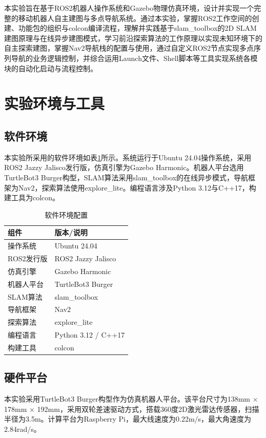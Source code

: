 \documentclass[a4paper,12pt]{article}
\begin{document}
本实验旨在基于ROS2机器人操作系统和Gazebo物理仿真环境，设计并实现一个完整的移动机器人自主建图与多点导航系统。通过本实验，掌握ROS2工作空间的创建、功能包的组织与colcon编译流程，理解并实践基于slam\_toolbox的2D SLAM建图原理与在线异步建图模式，学习前沿探索算法的工作原理以实现未知环境下的自主探索建图，掌握Nav2导航栈的配置与使用，通过自定义ROS2节点实现多点序列导航的业务逻辑控制，并综合运用Launch文件、Shell脚本等工具实现系统各模块的自动化启动与流程控制。

\section{实验环境与工具}

\subsection{软件环境}

本实验所采用的软件环境如表\ref{tab:software}所示。系统运行于Ubuntu 24.04操作系统，采用ROS2 Jazzy Jalisco发行版，仿真引擎为Gazebo Harmonic。机器人平台选用TurtleBot3 Burger构型，SLAM算法采用slam\_toolbox的在线异步模式，导航框架为Nav2，探索算法使用explore\_lite。编程语言涉及Python 3.12与C++17，构建工具为colcon。

\begin{table}[H]
\centering
\caption{软件环境配置}
\label{tab:software}
\begin{tabular}{ll}
\toprule
组件 & 版本/说明 \\
\midrule
操作系统 & Ubuntu 24.04  \\
ROS2发行版 & ROS2 Jazzy Jalisco \\
仿真引擎 & Gazebo Harmonic \\
机器人平台 & TurtleBot3 Burger \\
SLAM算法 & slam\_toolbox  \\
导航框架 & Nav2  \\
探索算法 & explore\_lite  \\
编程语言 & Python 3.12 / C++17 \\
构建工具 & colcon \\
\bottomrule
\end{tabular}
\end{table}

\subsection{硬件平台}

本实验采用TurtleBot3 Burger构型作为仿真机器人平台。该平台尺寸为138mm $\times$ 178mm $\times$ 192mm，采用双轮差速驱动方式，搭载360度2D激光雷达传感器，扫描半径为3.5m。计算平台为Raspberry Pi，最大线速度为0.22m/s，最大角速度为2.84rad/s。
\end{document}
